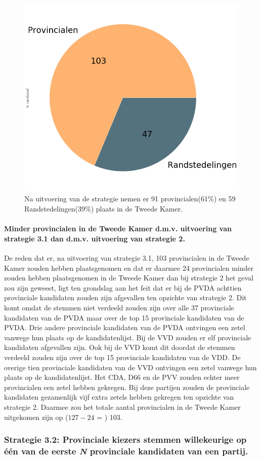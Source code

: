 \begin{figure}[H]
\centering
	\includegraphics[width=0.4\linewidth]{pie_chart_top15_of_topN_provincialen.png}

			\caption{Na uitvoering van de strategie nemen er 91 provincialen(61\%) en 59 Randstedelingen(39\%) plaats in de Tweede Kamer.}

\label{fig:pcS31P}
\end{figure}

\paragraph{Minder provincialen in de Tweede Kamer d.m.v. uitvoering van strategie 3.1 dan d.m.v. uitvoering van strategie 2.}
De reden dat er, na uitvoering van strategie 3.1, 103 provincialen in de Tweede Kamer zouden hebben plaatsgenomen en dat er daarmee 24 provincialen minder zouden hebben plaatsgenomen in de Tweede Kamer dan bij strategie 2 het geval zou zijn geweest, ligt ten grondslag aan het feit dat er bij de PVDA achttien provinciale kandidaten zouden zijn afgevallen ten opzichte van strategie 2. Dit komt omdat de stemmen niet verdeeld zouden zijn over alle 37 provinciale kandidaten van de PVDA maar over de top 15 provinciale kandidaten van de PVDA. Drie andere provinciale kandidaten van de PVDA ontvingen een zetel vanwege hun plaats op de kandidatenlijst. Bij de VVD zouden er elf provinciale kandidaten afgevallen zijn. Ook bij de VVD komt dit doordat de stemmen verdeeld zouden zijn over de top 15 provinciale kandidaten van de VDD. De overige tien provinciale kandidaten van de VVD ontvingen een zetel vanwege hun plaats op de kandidatenlijst. Het CDA, D66 en de PVV zouden echter meer provincialen een zetel hebben gekregen. Bij deze partijen zouden de provinciale kandidaten gezamenlijk vijf extra zetels hebben gekregen ten opzichte van strategie 2. Daarmee zou het totale aantal provincialen in de Tweede Kamer uitgekomen zijn op ($127-24$ = ) 103.



\subsubsection{Strategie 3.2: Provinciale kiezers stemmen willekeurige op één van de eerste \textit{N} provinciale kandidaten van een partij.}


